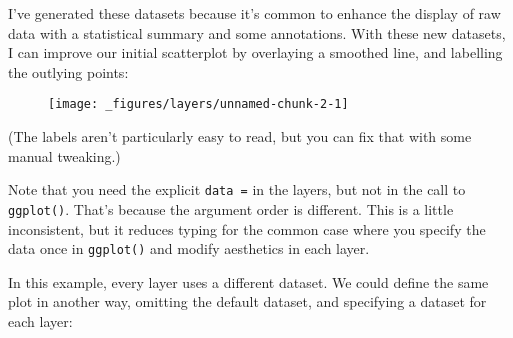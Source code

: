 I've generated these datasets because it's common to enhance the display
of raw data with a statistical summary and some annotations. With these
new datasets, I can improve our initial scatterplot by overlaying a
smoothed line, and labelling the outlying points:

\begin{Shaded}
\begin{Highlighting}[]
\OperatorTok{+}\StringTok{ }
\StringTok{  }\NormalTok{() }\OperatorTok{+}\StringTok{ }
\StringTok{  }\NormalTok{(} \NormalTok{, } \NormalTok{) }\OperatorTok{+}\StringTok{ }
\StringTok{  }\NormalTok{(}\NormalTok{(}
\end{Highlighting}
\end{Shaded}

\begin{figure}[H]
  \centering
  \texttt{[image: \_figures/layers/unnamed-chunk-2-1]}
\end{figure}

(The labels aren't particularly easy to read, but you can fix that with
some manual tweaking.)

Note that you need the explicit \texttt{data\ =} in the layers, but not
in the call to \texttt{ggplot()}. That's because the argument order is
different. This is a little inconsistent, but it reduces typing for the
common case where you specify the data once in \texttt{ggplot()} and
modify aesthetics in each layer.

In this example, every layer uses a different dataset. We could define
the same plot in another way, omitting the default dataset, and
specifying a dataset for each layer:

\begin{Shaded}
\begin{Highlighting}[]
\NormalTok{(} \OperatorTok{+}\StringTok{ }
\StringTok{  }\NormalTok{(}\OperatorTok{+}\StringTok{ }
\StringTok{  }\NormalTok{(}\OperatorTok{+}\StringTok{ }
\StringTok{  }\NormalTok{(}\NormalTok{(}
\end{Highlighting}
\end{Shaded}

